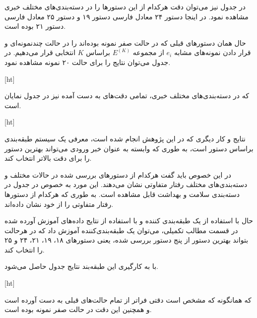 در جدول  نیز می‌توان دقت هرکدام از این دستورها را در دسته‌بندی‌های مختلف خبری مشاهده نمود. در اینجا دستور ۲۴ معادل فارسی دستور ۱۹ و دستور ۲۵ معادل فارسی دستور ۲۱ بوده است.

حال همان دستورهای قبلی که در حالت صفر نمونه بوده‌اند را در حالت چند‌نمونه‌ای و قرار دادن نمونه‌های مشابه
$e_i$
از مجموعه
$E^{(K)}$
براساس
$K$
انتخابی قرار می‌دهیم. در جدول  می‌توان نتایج را برای حالت ۲۰ نمونه مشاهده نمود.

[ht]

که در دسته‌بندی‌های مختلف خبری، تمامی دقت‌های به دست آمده نیز در جدول  نمایان است.

[ht]

نتایج و کار دیگری که در این پژوهش انجام شده است، معرفی یک سیستم طبقه‌بندی براساس دستور است، به طوری که وابسته به عنوان خبر ورودی می‌تواند بهترین دستور را برای دقت بالاتر انتخاب کند.

در این خصوص باید گفت هرکدام از دستورهای بررسی شده در حالات مختلف و دسته‌بندی‌های مختلف رفتار متفاوتی نشان‌ می‌دهند. این مورد به خصوص در جدول  در دسته‌بندی سلامت و بهداشت قابل مشاهده است. به طوری که هرکدام از دستورها رفتار متفاوتی را از خود نشان داده‌اند.

حال با استفاده از یک طبقه‌بندی کننده و با استفاده از نتایج داده‌های آموزش آورده شده در قسمت مطالب تکمیلی، می‌توان یک طبقه‌بندی‌کننده آموزش داد که در هرحالت بتواند بهترین دستور از پنج دستور بررسی شده، یعنی دستورهای ۱۸، ۱۹، ۲۱، ۲۴ و ۲۵ را انتخاب کند.

با به کارگیری این طبقه‌بند نتایج جدول  حاصل می‌شود.

[ht]

که همانگونه که مشخص است دقتی فراتر از تمام حالت‌های قبلی به دست آورده است و همچنین این دقت در حالت صفر نمونه بوده است.

